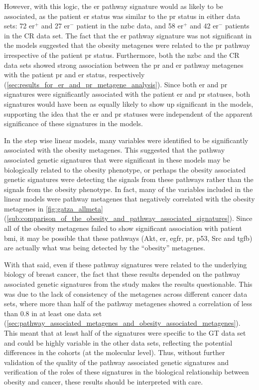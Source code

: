 However, with this logic, the \gls{er} pathway signature would as likely to be associated, as the   patient \gls{er} status was similar to the \gls{pr} status in either data sets: 72 \gls{er}$^+$ and 27 \gls{er}$^-$ patient in the \gls{nzbc} data, and 58 \gls{er}$^+$ and  42 \gls{er}$^-$ patients in the  CR data set.
The fact that the \gls{er} pathway signature was not significant in the models suggested that the obesity metagenes were related to the \gls{pr} pathway irrespective of the patient \gls{pr} status.
Furthermore, both the \gls{nzbc} and the CR data sets showed strong association between the \gls{pr} and \gls{er} pathway metagenes with the patient \gls{pr} and \gls{er} status, respectively (\cref{sec:results_for_er_and_pr_metagene_analysis}).
Since both \gls{er} and \gls{pr} signatures were significantly associated with the patient \gls{er} and \gls{pr} statuses, both signatures would have been as equally likely to show up significant in the models, supporting the idea that the \gls{er} and \gls{pr} statuses were independent of the apparent significance of these signatures in the models.

In the step wise linear models, many variables were identified to be significantly associated with the obesity metagenes.
This suggested that the pathway associated genetic signatures that were significant in these models may be biologically related to the obesity phenotype, or perhaps the obesity associated genetic signatures were detecting the signals from these pathways rather than the signals from the obesity phenotype.
In fact, many of the variables included in the linear models were pathway metagenes that negatively correlated with the obesity metagenes in \cref{fig:gatza_allmeta} (\cref{sub:comparison_of_the_obesity_and_pathway_associated_signatures}).
Since all of the obesity metagenes failed to show significant association with patient \gls{bmi}, it may be possible that these pathways (Akt, \gls{er}, \gls{egfr}, \gls{pr}, p53, Src and \gls{tgfb}) are actually what was being detected by the ``obesity'' metagenes.

With that said, even if these pathway signatures were related to the underlying biology of breast cancer, the fact that these results depended on the pathway associated genetic signatures from the \citet{Gatza2010a} study makes the results questionable.
This was due to the lack of consistency of the metagenes across different cancer data sets, where more than half of the pathway metagenes showed a correlation of less than 0.8 in at least one data set (\cref{sec:pathway_associated_metagenes_and_obesity_associated_metagenes}).
This meant that at least half of the signatures were specific to the GT data set and could be highly variable in the other data sets, reflecting the potential differences in the cohorts (at the molecular level).
Thus, without further validation of the quality of the pathway associated genetic signatures and verification of the roles of these signatures in the biological relationship between obesity and cancer, these results should be interpreted with care.

